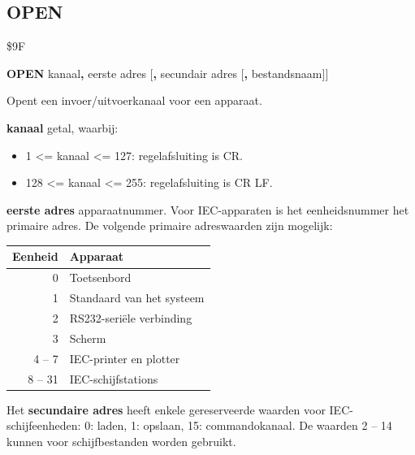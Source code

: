 
\newpage
\subsection{OPEN}
\begin{description}[leftmargin=2cm,style=nextline]
\item [Token:]    \$9F

\item [Formaat:]   {\bf OPEN} kanaal{\bf,} eerste adres [{\bf,} secundair adres [{\bf,} bestandsnaam]]

\item [Gebruik:]    Opent een invoer/uitvoerkanaal voor een apparaat.

{\bf kanaal} getal, waarbij:
                  \begin{itemize}
                     \item 1 <= kanaal <= 127: regelafsluiting is CR.                     \item 128 <= kanaal <= 255: regelafsluiting is CR LF.
                  \end{itemize}

                  {\bf eerste adres} apparaatnummer. Voor IEC-apparaten is het eenheidsnummer het primaire adres. De volgende primaire adreswaarden zijn mogelijk:

                  \begin{center}
                  {\setlength{\tabcolsep}{1mm}
                  \begin{tabular}{|r|l|}
                  \hline
                  {\bf Eenheid}  & {\bf Apparaat} \\
                  \hline
                  0    & Toetsenbord \\             1    & Standaard van het systeem \\                  2    & RS232-seriële verbinding \\                  3    & Scherm \\                  4 -- 7  & IEC-printer en plotter \\                  8 -- 31 & IEC-schijfstations \\
                  \hline
                  \end{tabular}
                  }
                  \end{center}

                  Het {\bf secundaire adres} heeft enkele gereserveerde waarden voor IEC-schijfeenheden: 0: laden, 1: opslaan, 15: commandokanaal. De waarden 2 -- 14 kunnen voor schijfbestanden worden gebruikt.


\end{description}

